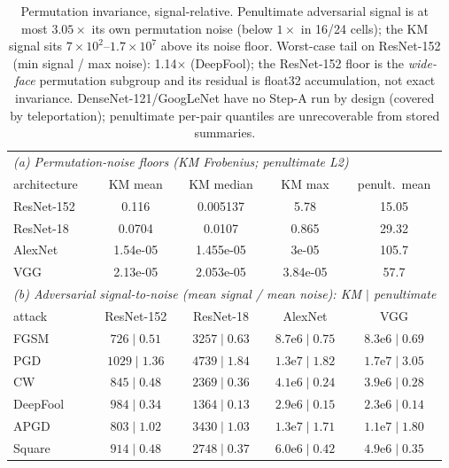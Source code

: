 \begin{table}[t]
\centering\small
\begin{tabular}{lcccc}
\toprule
\multicolumn{5}{l}{\emph{(a) Permutation-noise floors (KM Frobenius; penultimate L2)}}\\
architecture & KM mean & KM median & KM max & penult.\ mean \\
\midrule
ResNet-152 & 0.116 & 0.005137 & 5.78 & 15.05 \\
ResNet-18 & 0.0704 & 0.0107 & 0.865 & 29.32 \\
AlexNet & 1.54e-05 & 1.455e-05 & 3e-05 & 105.7 \\
VGG & 2.13e-05 & 2.053e-05 & 3.84e-05 & 57.7 \\
\midrule
\multicolumn{5}{l}{\emph{(b) Adversarial signal-to-noise (mean signal / mean noise): KM $\mid$ penultimate}}\\
attack & ResNet-152 & ResNet-18 & AlexNet & VGG \\
\midrule
FGSM & $726 \mid 0.51$ & $3257 \mid 0.63$ & $8.7\mathrm{e}6 \mid 0.75$ & $8.3\mathrm{e}6 \mid 0.69$ \\
PGD & $1029 \mid 1.36$ & $4739 \mid 1.84$ & $1.3\mathrm{e}7 \mid 1.82$ & $1.7\mathrm{e}7 \mid 3.05$ \\
CW & $845 \mid 0.48$ & $2369 \mid 0.36$ & $4.1\mathrm{e}6 \mid 0.24$ & $3.9\mathrm{e}6 \mid 0.28$ \\
DeepFool & $984 \mid 0.34$ & $1364 \mid 0.13$ & $2.9\mathrm{e}6 \mid 0.15$ & $2.3\mathrm{e}6 \mid 0.14$ \\
APGD & $803 \mid 1.02$ & $3430 \mid 1.03$ & $1.3\mathrm{e}7 \mid 1.71$ & $1.1\mathrm{e}7 \mid 1.80$ \\
Square & $914 \mid 0.48$ & $2748 \mid 0.37$ & $6.0\mathrm{e}6 \mid 0.42$ & $4.9\mathrm{e}6 \mid 0.35$ \\
\bottomrule
\end{tabular}
\caption{Permutation invariance, signal-relative. Penultimate adversarial signal is at most
$3.05\times$ its own permutation noise (below $1\times$ in 16/24 cells); the KM signal sits
$7\times10^{2}$--$1.7\times10^{7}$ above its noise floor. Worst-case tail on ResNet-152
(min signal / max noise): 1.14$\times$ (DeepFool); the ResNet-152 floor is the
\emph{wide-face} permutation subgroup and its residual is float32 accumulation, not exact invariance.
DenseNet-121/GoogLeNet have no Step-A run by design (covered by teleportation); penultimate
per-pair quantiles are unrecoverable from stored summaries.
}
\label{tab:signal-relative}
\end{table}
